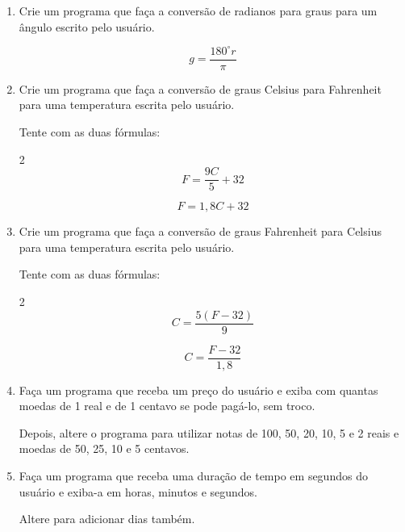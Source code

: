 \begin{enumerate}
	\item Crie um programa que faça 
	a conversão de 
	radianos para graus 
	para um ângulo 
	escrito pelo usuário.
	
		\begin{equation*}
			g = \frac{180^\circ r}{\pi} 			
		\end{equation*}	

	\item Crie um programa que faça 
	a conversão de 
	graus Celsius para Fahrenheit 
	para uma temperatura 
	escrita pelo usuário.
	
	Tente com as duas fórmulas:

	\begin{multicols}{2}			
		\begin{equation*}
			F = \frac{9C}{5} + 32			
		\end{equation*}
		
		\begin{equation*}
			F = 1,8C + 32
		\end{equation*}	
	\end{multicols}	
	\item Crie um programa que faça 
	a conversão de 
	graus Fahrenheit para Celsius
	para uma temperatura 
	escrita pelo usuário.
	
	Tente com as duas fórmulas:
	\begin{multicols}{2}
		\begin{equation*}
			C = \frac{5(F-32)}{9} 			
		\end{equation*}
		
		\begin{equation*}
			C = \frac{F-32}{1,8}
		\end{equation*}	
	\end{multicols}

\quebra	

	\item Faça um programa que receba 
	um preço do usuário 
	e exiba com quantas moedas de 
	1 real e de 1 centavo se pode pagá-lo,
	sem troco.  
	
	Depois, altere o programa para utilizar 
	notas de 100, 50, 20, 10, 5 e 2 reais  
	e moedas de 50, 25, 10 e 5 centavos.

	
	\item Faça um programa que receba 
	uma duração de tempo em segundos 
	do usuário e exiba-a em 
	horas, minutos e segundos.
	
	Altere para adicionar dias também.


\end{enumerate}
